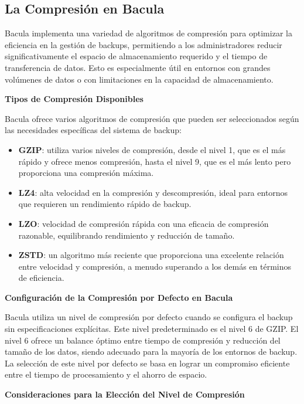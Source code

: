 \subsection{La Compresión en Bacula}

Bacula implementa una variedad de algoritmos de compresión para optimizar la eficiencia en la gestión de backups, permitiendo a los administradores reducir significativamente el espacio de almacenamiento requerido y el tiempo de transferencia de datos. Esto es especialmente útil en entornos con grandes volúmenes de datos o con limitaciones en la capacidad de almacenamiento.

\textbf{Tipos de Compresión Disponibles}\medskip

Bacula ofrece varios algoritmos de compresión que pueden ser seleccionados según las necesidades específicas del sistema de backup:

\begin{itemize}
    \item \textbf{GZIP}: utiliza varios niveles de compresión, desde el nivel 1, que es el más rápido y ofrece menos compresión, hasta el nivel 9, que es el más lento pero proporciona una compresión máxima.
    \item \textbf{LZ4}: alta velocidad en la compresión y descompresión, ideal para entornos que requieren un rendimiento rápido de backup.
    \item \textbf{LZO}: velocidad de compresión rápida con una eficacia de compresión razonable, equilibrando rendimiento y reducción de tamaño.
    \item \textbf{ZSTD}: un algoritmo más reciente que proporciona una excelente relación entre velocidad y compresión, a menudo superando a los demás en términos de eficiencia.
\end{itemize}

\textbf{Configuración de la Compresión por Defecto en Bacula}\medskip

Bacula utiliza un nivel de compresión por defecto cuando se configura el backup sin especificaciones explícitas. Este nivel predeterminado es el nivel 6 de GZIP. El nivel 6 ofrece un balance óptimo entre tiempo de compresión y reducción del tamaño de los datos, siendo adecuado para la mayoría de los entornos de backup. La selección de este nivel por defecto se basa en lograr un compromiso eficiente entre el tiempo de procesamiento y el ahorro de espacio.

\textbf{Consideraciones para la Elección del Nivel de Compresión}\medskip

